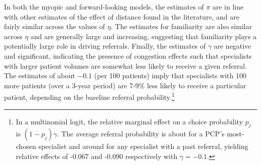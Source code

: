 \documentclass[12pt]{article}
\begin{document}
In both the myopic and forward-looking models, the estimates of $\pi$ are in line with other estimates of the effect of distance found in the literature, and are fairly similar across the values of $\eta$. The estimates for familiarity are also similar across $\eta$ and are generally large and increasing, suggesting that familiarity plays a potentially large role in driving referrals. Finally, the estimates of $\gamma$ are negative and significant, indicating the presence of congestion effects such that specialists with larger patient volumes are somewhat less likely to receive a given referral. The estimates of about $-0.1$ (per 100 patients) imply that specialists with 100 more patients (over a 3-year period) are 7-9\% less likely to receive a particular patient, depending on the baseline referral probability.\footnote{In a multinomial logit, the relative marginal effect on a choice probability $p_j$ is $(1-p_j) \gamma$. The average referral probability is about \topSpecShare{} for a PCP's most-chosen specialist and around \condRefProb{} for any specialist with a past referral, yielding relative effects of -0.067 and -0.090 respectively with $\gamma = -0.1$.} 
\end{document}
